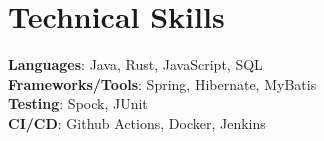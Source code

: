 \documentclass[letterpaper,11pt]{article}
\begin{document}
%
\section{Technical Skills}
\begin{itemize}[leftmargin=0.15in, label={}]
\small{\item{
\textbf{Languages}{: Java, Rust, JavaScript, SQL} \\
\textbf{Frameworks/Tools}{: Spring, Hibernate, MyBatis} \\
\textbf{Testing}{: Spock, JUnit} \\
\textbf{CI/CD}{: Github Actions, Docker, Jenkins} \\
}}
\end{itemize}


\end{document}
